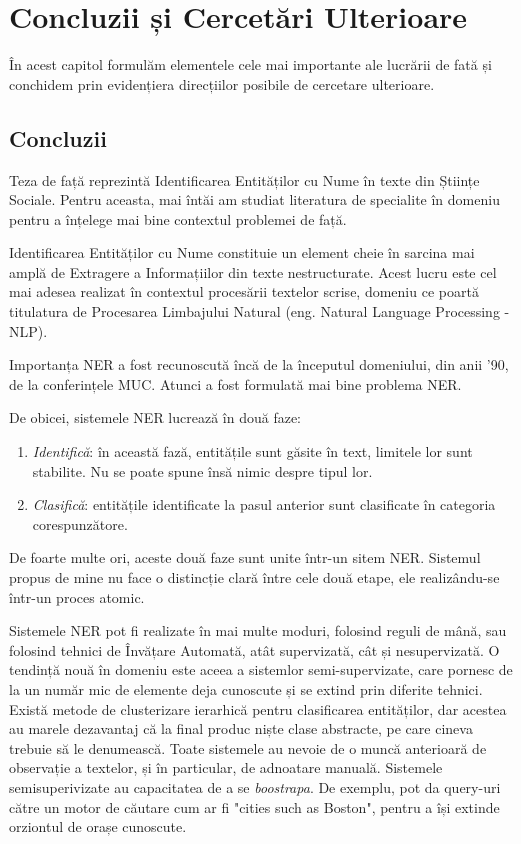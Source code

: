 \chapter{Concluzii și Cercetări Ulterioare}
\label{chapter:conclusions}

În acest capitol formulăm elementele cele mai importante ale lucrării de fată și conchidem prin evidențiera direcțiilor posibile de cercetare ulterioare.

\section{Concluzii}

Teza de față reprezintă Identificarea Entităților cu Nume în texte din Științe Sociale. Pentru aceasta, mai întăi am studiat literatura de specialite în domeniu pentru a înțelege mai bine contextul problemei de față.


Identificarea Entităților cu Nume constituie un element cheie în sarcina mai amplă de Extragere a Informațiilor din texte nestructurate. Acest lucru este cel mai adesea realizat în contextul procesării textelor scrise, domeniu ce poartă titulatura de Procesarea Limbajului Natural (eng. Natural Language Processing - NLP).

Importanța NER a fost recunoscută încă de la începutul domeniului, din anii '90, de la conferințele MUC. Atunci a fost formulată mai bine problema NER.

De obicei, sistemele NER lucrează în două faze:

\begin{enumerate}

\item \textit{Identifică}: în această fază, entitățile sunt găsite în text, limitele lor sunt stabilite. Nu se poate spune însă nimic despre tipul lor.
\item \textit{Clasifică}: entitățile identificate la pasul anterior sunt clasificate în categoria corespunzătore.

\end{enumerate}

De foarte multe ori, aceste două faze sunt unite într-un sitem NER. Sistemul propus de mine nu face o distincție clară între cele două etape, ele realizându-se într-un proces atomic.

Sistemele NER pot fi realizate în mai multe moduri, folosind reguli de mână, sau folosind tehnici de Învățare Automată, atât supervizată, cât și nesupervizată. O tendință nouă în domeniu este aceea a sistemlor semi-supervizate, care pornesc de la un număr mic de elemente deja cunoscute și se extind prin diferite tehnici. Există metode de clusterizare ierarhică pentru clasificarea entităților, dar acestea au marele dezavantaj că la final produc niște clase abstracte, pe care cineva trebuie să le denumească. Toate sistemele au nevoie de o muncă anterioară de observație a textelor, și în particular, de adnoatare manuală. Sistemele semisuperivizate au capacitatea de a se \textit{boostrapa}. De exemplu, pot da query-uri către un motor de căutare cum ar fi "cities such as Boston", pentru a își extinde orziontul de orașe cunoscute.

